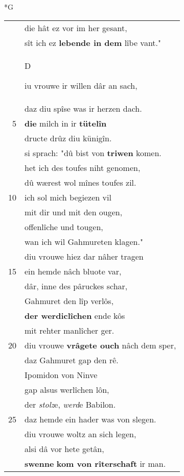 \documentclass[8pt,a4paper,notitlepage]{article}
\begin{document}
\newpage
\begin{table}[ht]
\begin{minipage}[t]{0.5\linewidth}
\small
\begin{center}*G
\end{center}
\begin{tabular}{rl}
 & die hât ez vor im her gesant,\\ 
 & sît ich ez \textbf{lebende in dem} lîbe vant."\\ 
 & \begin{large}D\end{large}iu vrouwe ir willen dâr an sach,\\ 
 & daz diu spîse was ir herzen dach.\\ 
5 & \textbf{die} milch in ir \textbf{tütelîn}\\ 
 & dructe drûz diu künigîn.\\ 
 & si sprach: "dû bist von \textbf{triwen} komen.\\ 
 & het ich des toufes niht genomen,\\ 
 & dû wærest wol mînes toufes zil.\\ 
10 & ich sol mich begiezen vil\\ 
 & mit dir und mit den ougen,\\ 
 & offenlîche und tougen,\\ 
 & wan ich wil Gahmureten klagen."\\ 
 & diu vrouwe hiez dar nâher tragen\\ 
15 & ein hemde nâch bluote var,\\ 
 & dâr, inne des pâruckes schar,\\ 
 & Gahmuret den lîp verlôs,\\ 
 & \textbf{der werdiclîchen} ende kôs\\ 
 & mit rehter manlîcher ger.\\ 
20 & diu vrouwe \textbf{vrâgete ouch} nâch dem sper,\\ 
 & daz Gahmuret gap den rê.\\ 
 & Ipomidon von Ninve\\ 
 & gap alsus werlîchen lôn,\\ 
 & der \textit{stolz}e, \textit{werd}e Babilon.\\ 
25 & daz hemde ein hader was von slegen.\\ 
 & diu vrouwe woltz an sich legen,\\ 
 & alsi dâ vor hete getân,\\ 
 & \textbf{swenne} \textbf{kom von rîterschaft} ir man.\\ 

\end{tabular}
\end{minipage}
\end{table}
\end{document}
